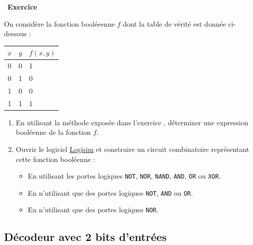\documentclass[
  11pt,
]{article}
\newcommand{\passthrough}[1]{#1}
\providecommand{\tightlist}{%
  \setlength{\itemsep}{0pt}\setlength{\parskip}{0pt}}
\newcounter{exo}
\newenvironment{exercice}[1]
{\par \medskip   \addtocounter{exo}{1} \noindent  
\begin{bclogo}[arrondi =0.1,   noborder = true, logo=\bccrayon, marge=4]{~\textbf{Exercice} \textbf{\theexo} {\itshape #1} }  \par}
{
\end{bclogo}
 \par \bigskip }
\newcounter{def}
\newcounter{logi}
\begin{document}
\begin{exercice}{}

On considère la fonction booléeenne \(f\) dont la table de vérité est
donnée ci-dessous :

\begin{longtable}[]{@{}cll@{}}
\toprule
\(x\) & \(y\) & \(f(x, y)\)\tabularnewline
\midrule
\endhead
0 & 0 & 1\tabularnewline
0 & 1 & 0\tabularnewline
1 & 0 & 0\tabularnewline
1 & 1 & 1\tabularnewline
\bottomrule
\end{longtable}

\begin{enumerate}
\def\labelenumi{\arabic{enumi}.}
\item
  En utilisant la méthode exposée dans l'exercice , déterminer une
  expression booléenne de la fonction \(f\).
\item
  Ouvrir le logiciel \href{http://www.cburch.com/logisim/}{Logisim} et
  construire un circuit combinatoire représentant cette fonction
  booléenne :

  \begin{itemize}
  \tightlist
  \item
    En utilisant les portes logiques \passthrough{\lstinline!NOT!},
    \passthrough{\lstinline!NOR!}, \passthrough{\lstinline!NAND!},
    \passthrough{\lstinline!AND!}, \passthrough{\lstinline!OR!} ou
    \passthrough{\lstinline!XOR!}.
  \item
    En n'utilisant que des portes logiques
    \passthrough{\lstinline!NOT!}, \passthrough{\lstinline!AND!} ou
    \passthrough{\lstinline!OR!}.
  \item
    En n'utilisant que des portes logiques
    \passthrough{\lstinline!NOR!}.
  \end{itemize}
\end{enumerate}

\end{exercice}

\hypertarget{duxe9codeur-avec-2-bits-dentruxe9es}{%
\subsection{Décodeur avec 2 bits
d'entrées}\label{duxe9codeur-avec-2-bits-dentruxe9es}}
\end{document}
